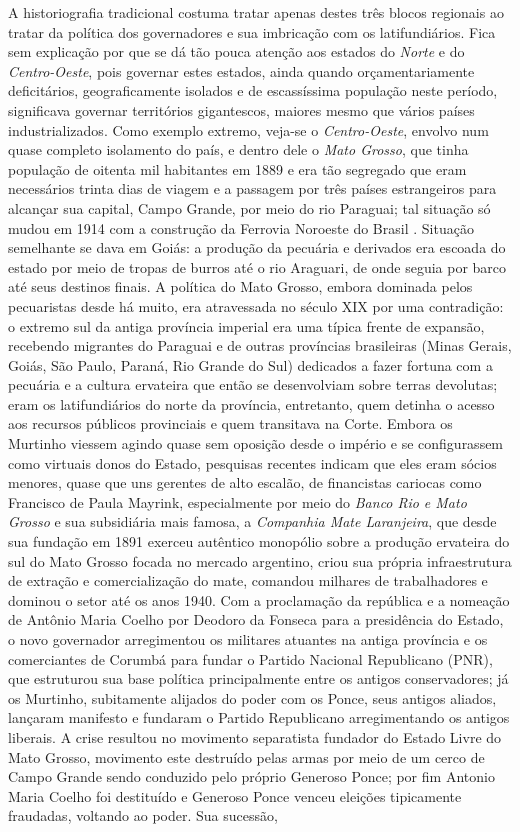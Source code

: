 A historiografia tradicional costuma tratar apenas destes três blocos regionais ao tratar da política dos governadores e sua imbricação com os latifundiários. Fica sem explicação por que se dá tão pouca atenção aos estados do \textit{Norte} e do \textit{Centro-Oeste}, pois governar estes estados, ainda quando orçamentariamente deficitários, geograficamente isolados e de escassíssima população neste período, significava governar territórios gigantescos, maiores mesmo que vários países industrializados. Como exemplo extremo, veja-se o \textit{Centro-Oeste}, envolvo num quase completo isolamento do país, e dentro dele o \textit{Mato Grosso}, que tinha população de oitenta mil habitantes em 1889 e era tão segregado que eram necessários trinta dias de viagem e a passagem por três países estrangeiros para alcançar sua capital, Campo Grande, por meio do rio Paraguai; tal situação só mudou em 1914 com a construção da Ferrovia Noroeste do Brasil \cite{almeida_matogrosso_2011}. Situação semelhante se dava em Goiás: a produção da pecuária e derivados era escoada do estado por meio de tropas de burros até o rio Araguari, de onde seguia por barco até seus destinos finais. A política do Mato Grosso, embora dominada pelos pecuaristas desde há muito, era atravessada no século XIX por uma contradição: o extremo sul da antiga província imperial era uma típica frente de expansão, recebendo migrantes do Paraguai e de outras províncias brasileiras (Minas Gerais, Goiás, São Paulo, Paraná, Rio Grande do Sul) dedicados a fazer fortuna com a pecuária e a cultura ervateira que então se desenvolviam sobre terras devolutas; eram os latifundiários do norte da província, entretanto, quem detinha o acesso aos recursos públicos provinciais e quem transitava na Corte. Embora os Murtinho viessem agindo quase sem oposição desde o império e se configurassem como virtuais donos do Estado, pesquisas recentes \cite{queiroz_murtinho_2010} indicam que eles eram sócios menores, quase que uns gerentes de alto escalão, de financistas cariocas como Francisco de Paula Mayrink, especialmente por meio do \textit{Banco Rio e Mato Grosso} e sua subsidiária mais famosa, a \textit{Companhia Mate Laranjeira}, que desde sua fundação em 1891 exerceu autêntico monopólio sobre a produção ervateira do sul do Mato Grosso focada no mercado argentino, criou sua própria infraestrutura de extração e comercialização do mate, comandou milhares de trabalhadores e dominou o setor até os anos 1940. Com a proclamação da república e a nomeação de Antônio Maria Coelho por Deodoro da Fonseca para a presidência do Estado, o novo governador arregimentou os militares atuantes na antiga província e os comerciantes de Corumbá para fundar o Partido Nacional Republicano (PNR), que estruturou sua base política principalmente entre os antigos conservadores; já os Murtinho, subitamente alijados do poder com os Ponce, seus antigos aliados, lançaram manifesto e fundaram o Partido Republicano arregimentando os antigos liberais. A crise resultou no movimento separatista fundador do Estado Livre do Mato Grosso, movimento este destruído pelas armas por meio de um cerco de Campo Grande sendo conduzido pelo próprio Generoso Ponce; por fim Antonio Maria Coelho foi destituído e Generoso Ponce venceu eleições tipicamente fraudadas, voltando ao poder. Sua sucessão, 